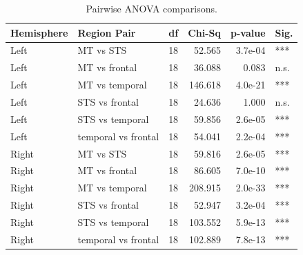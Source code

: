 \begin{table}[h]
\centering
\begin{tabular}{llrrrl}
\toprule
 Hemisphere   & Region Pair         &   df &   Chi-Sq &   p-value & Sig.   \\
\midrule
 Left         & MT vs STS           &   18 &   52.565 &   3.7e-04 & ***    \\
 Left         & MT vs frontal       &   18 &   36.088 &     0.083 & n.s.   \\
 Left         & MT vs temporal      &   18 &  146.618 &   4.0e-21 & ***    \\
 Left         & STS vs frontal      &   18 &   24.636 &     1.000 & n.s.   \\
 Left         & STS vs temporal     &   18 &   59.856 &   2.6e-05 & ***    \\
 Left         & temporal vs frontal &   18 &   54.041 &   2.2e-04 & ***    \\
 Right        & MT vs STS           &   18 &   59.816 &   2.6e-05 & ***    \\
 Right        & MT vs frontal       &   18 &   86.605 &   7.0e-10 & ***    \\
 Right        & MT vs temporal      &   18 &  208.915 &   2.0e-33 & ***    \\
 Right        & STS vs frontal      &   18 &   52.947 &   3.2e-04 & ***    \\
 Right        & STS vs temporal     &   18 &  103.552 &   5.9e-13 & ***    \\
 Right        & temporal vs frontal &   18 &  102.889 &   7.8e-13 & ***    \\
\bottomrule
\end{tabular}
\caption{Pairwise ANOVA comparisons.}
\end{table}